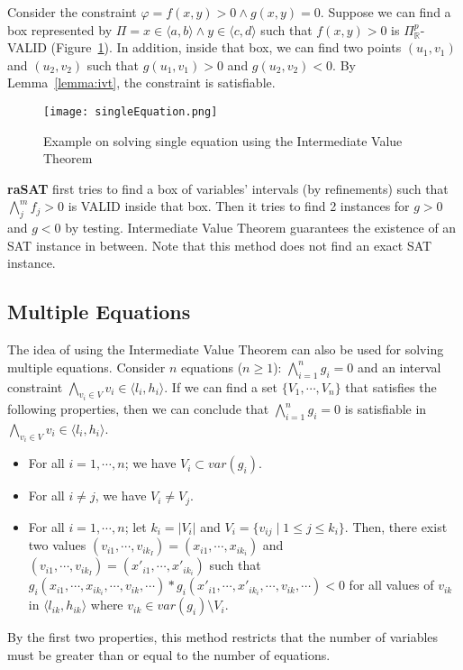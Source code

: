 \begin{example}
Consider the constraint $\varphi = f(x, y) > 0 \wedge g(x, y) = 0$. Suppose we can find a box represented by $\Pi = x \in \langle a, b \rangle \wedge y \in \langle c, d \rangle$ such that $f(x, y) > 0$ is $\Pi^p_\mathbb{R}$-VALID (Figure~\ref{fig:single-equation}). In addition, inside that box, we can find two points $(u_1, v_1)$ and $(u_2, v_2)$ such that $g(u_1, v_1) > 0$ and $g(u_2, v_2) < 0$. By Lemma~\ref{lemma:ivt}, the constraint is satisfiable.
\end{example}
\begin{figure}[ht]
\centering
\texttt{[image: singleEquation.png]} 
\caption{Example on solving single equation using the Intermediate Value Theorem} 
\label{fig:single-equation} 
\end{figure} 
{\bf raSAT} first tries to find a box of variables' intervals (by refinements) such that $\bigwedge \limits_{j}^m f_j > 0$ is VALID inside that box. Then it tries to find 2 instances for $g > 0$ and $g < 0$ by testing. 
Intermediate Value Theorem guarantees the existence of an SAT instance in between. 
Note that this method does not find an exact SAT instance. 
\subsection*{Multiple Equations}
The idea of using the Intermediate Value Theorem can also be used for solving multiple equations. Consider $n$ equations ($n \ge 1$): $\bigwedge \limits_{i=1}^n g_i = 0$ and an interval constraint ${\bigwedge\limits_{v_i \in V}v_i \in \langle l_i, h_i \rangle}$. If we can find a set ${\{V_1, \cdots, V_n\}}$ that satisfies the following properties, then we can conclude that $\bigwedge \limits_{i=1}^n g_i = 0$ is satisfiable in ${\bigwedge\limits_{v_i \in V}v_i \in \langle l_i, h_i \rangle}$.
\begin{itemize}
\item For all $i = 1, \cdots, n$; we have ${V_i \subset var(g_i)}$.
\item For all $i \neq j$, we have $V_i \neq V_j$.
\item For all $i = 1, \cdots, n$; let $k_i = |V_i|$ and $V_i = \{v_{ij} \; | \; 1 \le j \le k_i \}$. Then, there exist two values ${(v_{i1}, \cdots, v_{ik_I}) = (x_{i1}, \cdots, x_{ik_i})}$ and ${(v_{i1}, \cdots, v_{ik_I}) = (x'_{i1}, \cdots, x'_{ik_i})}$ such that $g_i(x_{i1}, \cdots, x_{ik_i}, \cdots, v_{ik}, \cdots) * g_i(x'_{i1}, \cdots, x'_{ik_i}, \cdots, v_{ik}, \cdots) < 0$ for all values of $v_{ik}$ in $\langle l_{ik}, h_{ik} \rangle$ where $v_{ik} \in var(g_i) \setminus V_i$.
\end{itemize}
By the first two properties, this method restricts that the number of variables must be greater than or equal to the number of equations.

